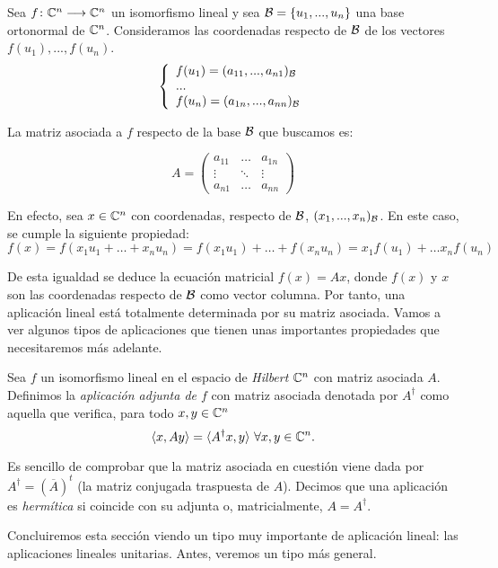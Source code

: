Sea $f\colon \mathbb{C}^n\longrightarrow \mathbb{C}^n$ un isomorfismo lineal y sea $\mathcal{B}=\{u_1,...,u_n\}$ una base ortonormal de $\mathbb{C}^n$. Consideramos las coordenadas respecto de $\mathcal{B}$ de los vectores $f(u_1),...,f(u_n)$.
\[\left\{ \begin{array}{ll} f(u_1)=(a_{11},...,a_{n1})_{\mathcal{B}} \\...\\f(u_n)=(a_{1n},...,a_{nn})_{\mathcal{B}} \\ \end{array} \right.\]

La matriz asociada a $f$ respecto de la base $\mathcal{B}$ que buscamos es:

\[A=\left(\begin{matrix} a_{11}&\hdots&a_{1n}\\ \vdots&\ddots&\vdots\\ a_{n1}&\hdots&a_{nn} \end{matrix}\right)\]

En efecto, sea $x\in \mathbb{C}^n$ con coordenadas, respecto de $\mathcal{B}$, $(x_1,...,x_n)_{\mathcal{B}}$. En este caso, se cumple la siguiente propiedad:
$$f(x)=f(x_1u_1+\hdots+x_nu_n)=f(x_1u_1)+\hdots+f(x_nu_n)=x_1f(u_1)+\hdots x_nf(u_n)$$ 

De esta igualdad se deduce la ecuación matricial $f(x)=Ax$, donde $f(x)$ y $x$ son las coordenadas respecto de $\mathcal{B}$ como vector columna. Por tanto, una aplicación lineal está totalmente determinada por su matriz asociada. Vamos a ver algunos tipos de aplicaciones que tienen unas importantes propiedades que necesitaremos más adelante.

\begin{definition} Sea $f$ un isomorfismo lineal en el espacio de \textit{Hilbert} $\mathbb{C}^n$ con matriz asociada $A$. Definimos la \textit{aplicación adjunta de $f$} con matriz asociada denotada por $A^\dag$ como aquella que verifica, para todo $x,y\in\mathbb{C}^n$
$$\dotproduct{x}{Ay}=\dotproduct{A^\dag x}{y}\ \forall x,y\in\C^n.
$$

Es sencillo de comprobar que la matriz asociada en cuestión viene dada por $A^\dag=(\overline{A})^t$ (la matriz conjugada traspuesta de $A$). Decimos que una aplicación es \textit{hermítica} si coincide con su adjunta o, matricialmente, $A=A^\dag$.
\end{definition}

Concluiremos esta sección viendo un tipo muy importante de aplicación lineal: las aplicaciones lineales unitarias. Antes, veremos un tipo más general.

